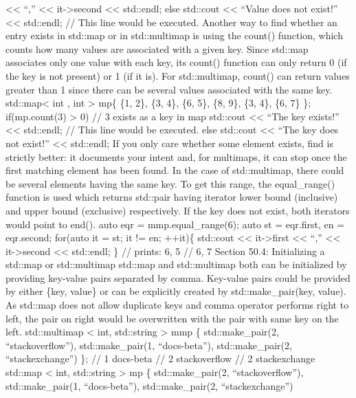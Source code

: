 \textless\textless{} ``,'' \textless\textless{} it-\textgreater second
\textless\textless{} std::endl; else std::cout \textless\textless{}
``Value does not exist!'' \textless\textless{} std::endl; // This line
would be executed. Another way to ﬁnd whether an entry exists in
std::map or in std::multimap is using the count() function, which counts
how many values are associated with a given key. Since std::map
associates only one value with each key, its count() function can only
return 0 (if the key is not present) or 1 (if it is). For std::multimap,
count() can return values greater than 1 since there can be several
values associated with the same key. std::map\textless{} int , int
\textgreater{} mp\{ \{1, 2\}, \{3, 4\}, \{6, 5\}, \{8, 9\}, \{3, 4\},
\{6, 7\} \}; if(mp.count(3) \textgreater{} 0) // 3 exists as a key in
map std::cout \textless\textless{} ``The key exists!''
\textless\textless{} std::endl; // This line would be executed. else
std::cout \textless\textless{} ``The key does not exist!''
\textless\textless{} std::endl; If you only care whether some element
exists, find is strictly better: it documents your intent and, for
multimaps, it can stop once the ﬁrst matching element has been found. In
the case of std::multimap, there could be several elements having the
same key. To get this range, the equal\_range() function is used which
returns std::pair having iterator lower bound (inclusive) and upper
bound (exclusive) respectively. If the key does not exist, both
iterators would point to end(). auto eqr = mmp.equal\_range(6); auto st
= eqr.first, en = eqr.second; for(auto it = st; it != en; ++it)\{
std::cout \textless\textless{} it-\textgreater first
\textless\textless{} ``,'' \textless\textless{} it-\textgreater second
\textless\textless{} std::endl; \} // prints: 6, 5 // 6, 7 Section 50.4:
Initializing a std::map or std::multimap std::map and std::multimap both
can be initialized by providing key-value pairs separated by comma.
Key-value pairs could be provided by either \{key, value\} or can be
explicitly created by std::make\_pair(key, value). As std::map does not
allow duplicate keys and comma operator performs right to left, the pair
on right would be overwritten with the pair with same key on the left.
std::multimap \textless{} int, std::string \textgreater{} mmp \{
std::make\_pair(2, ``stackoverflow''), std::make\_pair(1,
``docs-beta''), std::make\_pair(2, ``stackexchange'') \}; // 1 docs-beta
// 2 stackoverflow // 2 stackexchange std::map \textless{} int,
std::string \textgreater{} mp \{ std::make\_pair(2, ``stackoverflow''),
std::make\_pair(1, ``docs-beta''), std::make\_pair(2, ``stackexchange'')

